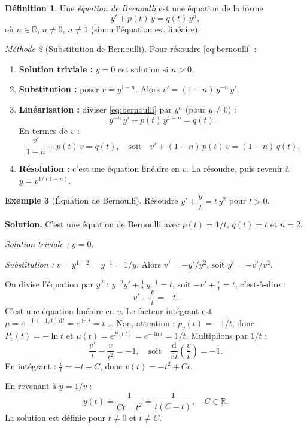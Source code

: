 \documentclass[12pt,a4paper,openany]{book}
\theoremstyle{definition}
\newtheorem{definition}{Définition}[chapter]
\newtheorem{exemple}[definition]{Exemple}
\theoremstyle{plain}
\theoremstyle{remark}
\newtheorem{methode}[definition]{Méthode}
\newcommand{\R}{\mathbb{R}}
\newcommand{\dd}{\mathrm{d}}
\begin{document}
\begin{definition}
\label{def:bernoulli}
Une \emph{équation de Bernoulli} est une équation de la forme
\begin{equation}
\label{eq:bernoulli}
y' + p(t)\,y = q(t)\,y^n,
\end{equation}
où $n \in \R$, $n \neq 0$, $n \neq 1$ (sinon l'équation est linéaire).
\end{definition}

\begin{methode}[Substitution de Bernoulli]
\label{meth:bernoulli}
Pour résoudre \eqref{eq:bernoulli} :
\begin{enumerate}
\item \textbf{Solution triviale :} $y = 0$ est solution si $n > 0$.
\item \textbf{Substitution :} poser $v = y^{1-n}$. Alors $v' = (1-n)\,y^{-n}\,y'$.
\item \textbf{Linéarisation :} diviser \eqref{eq:bernoulli} par $y^n$ (pour $y \neq 0$) :
\[
y^{-n}\,y' + p(t)\,y^{1-n} = q(t).
\]
En termes de $v$ :
\[
\frac{v'}{1-n} + p(t)\,v = q(t), \quad \text{soit} \quad v' + (1-n)\,p(t)\,v = (1-n)\,q(t).
\]
\item \textbf{Résolution :} c'est une équation linéaire en $v$. La résoudre, puis revenir à $y = v^{1/(1-n)}$.
\end{enumerate}
\end{methode}

\begin{exemple}[Équation de Bernoulli]
\label{ex:bernoulli-1}
Résoudre $y' + \dfrac{y}{t} = t\,y^2$ pour $t > 0$.

\textbf{Solution.} C'est une équation de Bernoulli avec $p(t) = 1/t$, $q(t) = t$ et $n = 2$.

\textit{Solution triviale :} $y = 0$.

\textit{Substitution :} $v = y^{1-2} = y^{-1} = 1/y$. Alors $v' = -y'/y^2$, soit $y' = -v'/v^2$.

On divise l'équation par $y^2$ : $y^{-2}y' + \frac{1}{t}\,y^{-1} = t$, soit $-v' + \frac{v}{t} = t$, c'est-à-dire :
\[
v' - \frac{v}{t} = -t.
\]
C'est une équation linéaire en $v$. Le facteur intégrant est $\mu = e^{-\int (-1/t)\,\dd t} = e^{\ln t} = t$ \ldots{} Non, attention : $p_v(t) = -1/t$, donc $P_v(t) = -\ln t$ et $\mu(t) = e^{P_v(t)} = e^{-\ln t} = 1/t$. Multiplions par $1/t$ :
\[
\frac{v'}{t} - \frac{v}{t^2} = -1, \quad \text{soit} \quad \frac{\dd}{\dd t}\!\left(\frac{v}{t}\right) = -1.
\]
En intégrant : $\frac{v}{t} = -t + C$, donc $v(t) = -t^2 + Ct$.

En revenant à $y = 1/v$ :
\[
\boxed{y(t) = \frac{1}{Ct - t^2} = \frac{1}{t(C - t)}, \quad C \in \R.}
\]
La solution est définie pour $t \neq 0$ et $t \neq C$.
\end{exemple}
\end{document}
